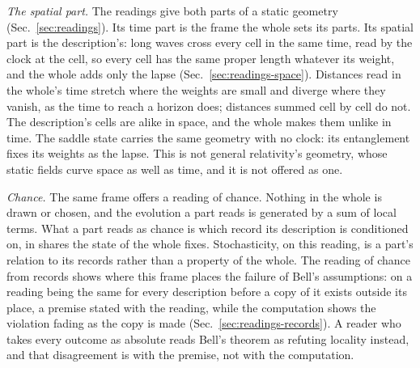 \documentclass[aps,prd,reprint,superscriptaddress]{revtex4-2}
\begin{document}
\emph{The spatial part.} The readings give both parts of a static geometry (Sec.~\ref{sec:readings}). Its time part is the frame the whole sets its parts. Its spatial part is the description's: long waves cross every cell in the same time, read by the clock at the cell, so every cell has the same proper length whatever its weight, and the whole adds only the lapse (Sec.~\ref{sec:readings-space}). Distances read in the whole's time stretch where the weights are small and diverge where they vanish, as the time to reach a horizon does; distances summed cell by cell do not. The description's cells are alike in space, and the whole makes them unlike in time. The saddle state carries the same geometry with no clock: its entanglement fixes its weights as the lapse. This is not general relativity's geometry, whose static fields curve space as well as time, and it is not offered as one.

\emph{Chance.} The same frame offers a reading of chance. Nothing in the whole is drawn or chosen, and the evolution a part reads is generated by a sum of local terms. What a part reads as chance is which record its description is conditioned on, in shares the state of the whole fixes. Stochasticity, on this reading, is a part's relation to its records rather than a property of the whole. The reading of chance from records shows where this frame places the failure of Bell's assumptions: on a reading being the same for every description before a copy of it exists outside its place, a premise stated with the reading, while the computation shows the violation fading as the copy is made (Sec.~\ref{sec:readings-records}). A reader who takes every outcome as absolute reads Bell's theorem as refuting locality instead, and that disagreement is with the premise, not with the computation.
\end{document}
